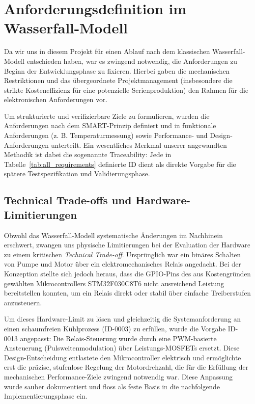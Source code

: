 \section{Anforderungsdefinition im Wasserfall-Modell}
Da wir uns in diesem Projekt für einen Ablauf nach dem klassischen Wasserfall-Modell entschieden haben, war es zwingend notwendig, die Anforderungen zu Beginn der Entwicklungsphase zu fixieren. Hierbei gaben die mechanischen Restriktionen und das übergeordnete Projektmanagement (insbesondere die strikte Kosteneffizienz für eine potenzielle Serienproduktion) den Rahmen für die elektronischen Anforderungen vor.

Um strukturierte und verifizierbare Ziele zu formulieren, wurden die Anforderungen nach dem SMART-Prinzip definiert und in funktionale Anforderungen (z. B. Temperaturmessung) sowie Performance- und Design-Anforderungen unterteilt. Ein wesentliches Merkmal unserer angewandten Methodik ist dabei die sogenannte Traceability: Jede in Tabelle~\ref{tab:all_requirements} definierte ID dient als direkte Vorgabe für die spätere Testspezifikation und Validierungsphase.

\subsection{Technical Trade-offs und Hardware-Limitierungen}
Obwohl das Wasserfall-Modell systematische Änderungen im Nachhinein erschwert, zwangen uns physische Limitierungen bei der Evaluation der Hardware zu einem kritischen \textit{Technical Trade-off}. Ursprünglich war ein binäres Schalten von Pumpe und Motor über ein elektromechanisches Relais angedacht. Bei der Konzeption stellte sich jedoch heraus, dass die GPIO-Pins des aus Kostengründen gewählten Mikrocontrollers STM32F030C8T6 nicht ausreichend Leistung bereitstellen konnten, um ein Relais direkt oder stabil über einfache Treiberstufen anzusteuern.

Um dieses Hardware-Limit zu lösen und gleichzeitig die Systemanforderung an einen schaumfreien Kühlprozess (ID-0003) zu erfüllen, wurde die Vorgabe ID-0013 angepasst: Die Relais-Steuerung wurde durch eine PWM-basierte Ansteuerung (Pulsweitenmodulation) über Leistungs-MOSFETs ersetzt. Diese Design-Entscheidung entlastete den Mikrocontroller elektrisch und ermöglichte erst die präzise, stufenlose Regelung der Motordrehzahl, die für die Erfüllung der mechanischen Performance-Ziele zwingend notwendig war. Diese Anpassung wurde sauber dokumentiert und floss als feste Basis in die nachfolgende Implementierungsphase ein.

